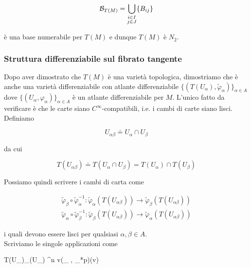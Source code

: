 \begin{equation}
	\mathcal{B}_{T(M)} = \bigcup_{\substack{ i \in I \\ j \in J }} \{B_{ij}\}
\end{equation}

è una base numerabile per $ T(M) $ e dunque $ T(M) $ è $ N_{2} $.

\subsubsection{Struttura differenziabile sul fibrato tangente}

Dopo aver dimostrato che $ T(M) $ è una varietà topologica, dimostriamo che è anche una varietà differenziabile con atlante differenziabile $ \{(T(U_{\alpha}),\tilde{\varphi}_{\alpha})\}_{\alpha \in A} $ dove $ \{(U_{\alpha},\varphi_{\alpha})\}_{\alpha \in A} $ è un atlante differenziabile per $ M $. L'unico fatto da verificare è che le carte siano $ C^{\infty} $-compatibili, i.e. i cambi di carte siano lisci. \\
Definiamo

\begin{equation}
	U_{\alpha \beta} \doteq U_{\alpha} \cap U_{\beta}
\end{equation}

da cui

\begin{equation}
	T(U_{\alpha \beta}) \doteq T(U_{\alpha} \cap U_{\beta}) = T(U_{\alpha}) \cap T(U_{\beta})
\end{equation}

Possiamo quindi scrivere i cambi di carta come

\begin{gather}
	\tilde{\varphi}_{\beta} \circ \tilde{\varphi}_{\alpha}^{-1} : \tilde{\varphi}_{\alpha}(T(U_{\alpha \beta})) \to \tilde{\varphi}_{\beta}(T(U_{\alpha \beta})) \\
	\tilde{\varphi}_{\alpha} \circ \tilde{\varphi}_{\beta}^{-1} : \tilde{\varphi}_{\beta}(T(U_{\alpha \beta})) \to \tilde{\varphi}_{\alpha}(T(U_{\alpha \beta}))
\end{gather}

i quali devono essere lisci per qualsiasi $ \alpha,\beta \in A $. \\
Scriviamo le singole applicazioni come

\map{\tilde{\varphi}_{\alpha}}
	{T(U_{\alpha})}{\varphi_{\alpha}(U_{\alpha}) \times \R^{n}}
	{v}{(\varphi_{\alpha} \circ \pi, \varphi_{*p})(v)}

